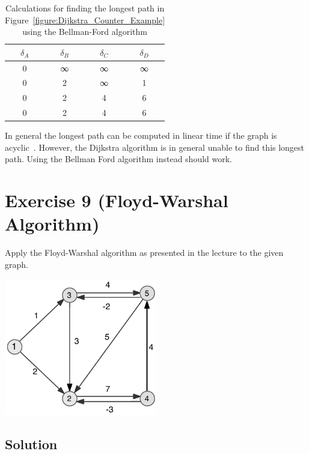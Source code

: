 \documentclass[a4paper, 12pt]{report}
\begin{document}
\begin{table}[htbp]
    \caption{
        Calculations for finding the longest path in
        Figure~\ref{figure:Dijkstra_Counter_Example} using the Bellman-Ford
        algorithm
    }
    \begin{center}
        \begin{tabular}{cccc}
            $δ_A$ & $δ_B$ & $δ_C$ & $δ_D$\\
            \hline
            0     &  ∞    &  ∞    &  ∞\\
            0     &  2    &  ∞    &  1\\
            0     &  2    &  4    &  6\\
            0     &  2    &  4    &  6\\
        \end{tabular}
    \end{center}
    \label{table:Bellman_Ford_Longest_Path}
\end{table}

In general the longest path can be computed in linear time if the graph is
acyclic~\cite{Wikipedia_Longest_Path}. However, the Dijkstra algorithm is in
general unable to find this longest path. Using the Bellman Ford
algorithm instead should work.

\section{Exercise 9 (Floyd-Warshal Algorithm)}

Apply the Floyd-Warshal algorithm as presented in the lecture to the given
graph.

\begin{center}
    \includegraphics[width=0.5\textwidth]{Figures/Exercise_9}
\end{center}

\subsection{Solution}
\end{document}
